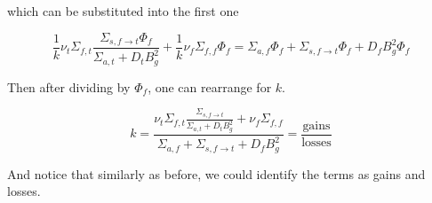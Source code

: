\noindent which can be substituted into the first one

\begin{equation}
\frac{1}{k}\nu_t\Sigma_{f,t}\frac{\Sigma_{s,f\rightarrow t}\Phi_f}{\Sigma_{a,t}  + D_tB_g^2}+\frac{1}{k}\nu_f\Sigma_{f,f}\Phi_f=\Sigma_{a,f}\Phi_f + \Sigma_{s,f\rightarrow t}\Phi_f + D_fB_g^2\Phi_f
\end{equation}

\noindent Then after dividing by $\Phi_f$, one can rearrange for $k$.

\begin{equation}
k=\frac{\nu_t\Sigma_{f,t}\frac{\Sigma_{s,f\rightarrow t}}{\Sigma_{a,t}  + D_tB_g^2}+\nu_f\Sigma_{f,f}}{\Sigma_{a,f} + \Sigma_{s,f\rightarrow t} + D_fB_g^2}=\frac{\text{gains}}{\text{losses}}
\end{equation}

And notice that similarly as before, we could identify the terms as gains and losses.


